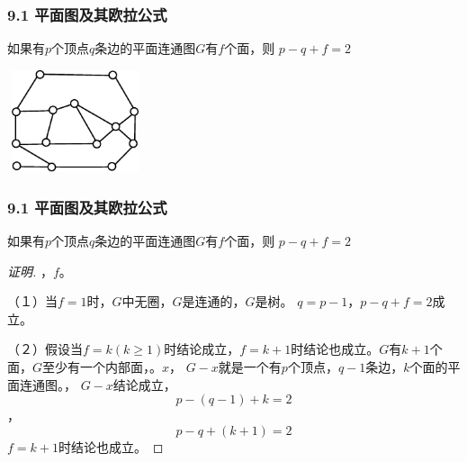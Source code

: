 \documentclass{beamer}
\begin{document}
\begin{CJK}{UTF8}{gbsn}
\begin{frame}
  \frametitle{9.1 平面图及其欧拉公式}
  \begin{Thm1}
    如果有$p$个顶点$q$条边的平面连通图$G$有$f$个面，则
      $p - q + f = 2$
  \end{Thm1}
\vspace{1cm}
\centering
    \includegraphics[width=4cm,height=3cm]{euler}
\end{frame}
\begin{frame}
  \frametitle{9.1 平面图及其欧拉公式}
  \begin{Thm1}
    如果有$p$个顶点$q$条边的平面连通图$G$有$f$个面，则
      $p - q + f = 2$
    \end{Thm1}
    \pause\begin{proof}[证明]
   ，$f$。

  \pause（１）当$f=1$时，\pause $G$中无圈，$G$是连通的，$G$是树。
  $q=p-1$，\pause $p-q+f=2$成立。

  \pause（２）假设当$f=k(k\geq 1)$时结论成立，$f=k+1$时结论也成立。$G$有$k+1$个面，$G$至少有一个内部面，。$x$，
  $G-x$就是一个有$p$个顶点，\pause$q-1$条边，\pause$k$个面的平面连通图。，
  $G-x$结论成立，\[p-(q-1) + k =2\]
  ，\[p-q+ (k+1) =2\]
  $f=k+1$时结论也成立。
\end{proof}


\end{frame}
\end{CJK}
\end{document}
